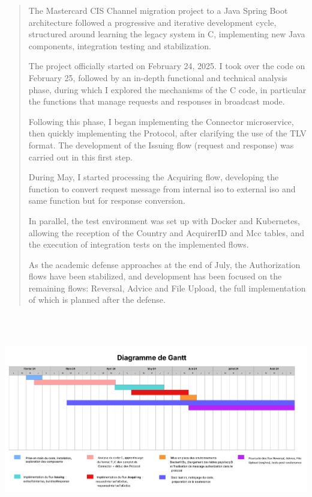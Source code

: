 \documentclass[12pt,a4paper]{report}
\begin{document}
\begin{quote}
The Mastercard CIS Channel migration project to a Java Spring Boot
architecture followed a progressive and iterative development cycle,
structured around learning the legacy system in C, implementing new Java
components, integration testing and stabilization.

The project officially started on February 24, 2025. I took over the
code on February 25, followed by an in-depth functional and technical
analysis phase, during which I explored the mechanisms of the C code, in
particular the functions that manage requests and responses in broadcast
mode.

Following this phase, I began implementing the Connector microservice,
then quickly implementing the Protocol, after clarifying the use of the
TLV format. The development of the Issuing flow (request and response)
was carried out in this first step.

During May, I started processing the Acquiring flow, developing the
function to convert request message from internal iso to external iso
and same function but for response conversion.

In parallel, the test environment was set up with Docker and Kubernetes,
allowing the reception of the Country and AcquirerID and Mcc tables, and
the execution of integration tests on the implemented flows.

As the academic defense approaches at the end of July, the Authorization
flows have been stabilized, and development has been focused on the
remaining flows: Reversal, Advice and File Upload, the full
implementation of which is planned after the defense.
\end{quote}

\includegraphics[width=7.54861in,height=3.64028in]{vertopal_d1b0b2209edd4c6aa8254f57daa0953b/media/image34.png}
\end{document}
